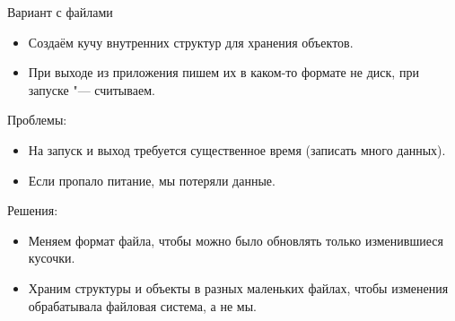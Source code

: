 \begin{frame}{Вариант с файлами}
	\begin{itemize}
		\item Создаём кучу внутренних структур для хранения объектов.
		\item При выходе из приложения пишем их в каком-то формате не диск, при запуске "--- считываем.
	\end{itemize}
	Проблемы:\pause
	\begin{itemize}
		\item На запуск и выход требуется существенное время (записать много данных).
		\item Если пропало питание, мы потеряли данные.
	\end{itemize}
	Решения:\pause
	\begin{itemize}
		\item Меняем формат файла, чтобы можно было обновлять только изменившиеся кусочки.
		\item Храним структуры и объекты в разных маленьких файлах, чтобы изменения обрабатывала файловая система, а не мы.
	\end{itemize}
\end{frame}


